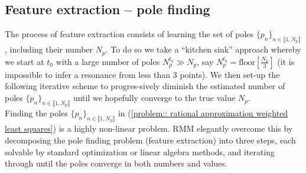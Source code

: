 \documentclass{article}
\begin{document}


\subsection{\label{sec: Feature extraction}Feature extraction -- pole finding}

The process of feature extraction consists of learning the set of poles $\big\{ p_n \big\}_{n \in \llbracket 1, N_p \rrbracket}$, including their number $N_p$.
To do so we take a ``kitchen sink'' approach whereby we start at $t_0$ with a large number of poles $N_p^{t_0} \gg N_p$, say $N_p^{t_0} = \mathrm{floor}\left[\frac{N_k}{3}\right]$ (it is impossible to infer a resonance from less than 3 points). We then set-up the following iterative scheme to progres-sively diminish the estimated number of poles $\big\{ p_n \big\}_{n \in \llbracket 1, N_p \rrbracket}$ until we hopefully converge to the true value $N_p$. \\

Finding the poles $\big\{ p_n \big\}_{n \in \llbracket 1, N_p \rrbracket}$ in (\ref{problem:: rational approximation weighted least squares}) is a highly non-linear problem. RMM elegantly overcome this by decomposing the pole finding problem (feature extraction) into three steps, each solvable by standard optimization or linear algebra methods, and iterating through until the poles converge in both numbers and values. 


\end{document}
